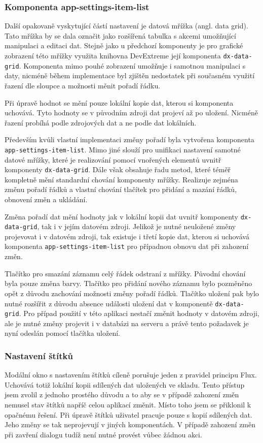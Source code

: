 \subsubsection*{Komponenta app-settings-item-list}
Další opakovaně vyskytující částí nastavení je datová mřížka (angl. data grid). Tato mřížka by se dala označit jako rozšířená tabulka s akcemi umožňující manipulaci a editaci dat. Stejně jako u předchozí komponenty je pro grafické zobrazení této mřížky využita knihovna DevExtreme její komponenta \texttt{dx-data-grid}. Komponenta mimo pouhé zobrazení umožňuje i samotnou manipulaci s daty, nicméně během implementace byl zjištěn nedostatek při současném využití řazení dle sloupce a možnosti měnit pořadí řádku.

Při úpravě hodnot se mění pouze lokální kopie dat, kterou si komponenta uchovává. Tyto hodnoty se v původním zdroji dat projeví až po uložení. Nicméně řazení probíhá podle zdrojových dat a ne podle dat lokálních.

Především kvůli vlastní implementaci změny pořadí byla vytvořena komponenta \texttt{app-settings-item-list}. Mimo jiné slouží pro unifikaci nastavení samotné datové mřížky, které je realizování pomocí vnořených elementů uvnitř komponenty \texttt{dx-data-grid}. Dále však obsahuje řadu metod, které téměř kompletně mění standardní chování komponenty mřížky. Realizuje zejména změnu pořadí řádků a vlastní chování tlačítek pro přidání a mazání řádků, obnovení změn a ukládání.

Změna pořadí dat mění hodnoty jak v lokální kopii dat uvnitř komponenty \texttt{dx-data-grid}, tak i v jejím datovém zdroji. Jelikož je nutné neuložené změny projevovat i v datovém zdroji, tak existuje i třetí kopie dat, kterou si uchovává komponenta \texttt{app-settings-item-list} pro případnou obnovu dat při zahození změn.

Tlačítko pro smazání záznamu celý řádek odstraní z mřížky. Původní chování byla pouze změna barvy. Tlačítko pro přidání nového záznamu bylo pozměněno opět z důvodu zachování možnosti změny pořadí řádků. Tlačítko uložení pak bylo nutné rozšířit z důvodu absence události uložení dat v komponentě \texttt{dx-data-grid}. Pro případ použití v této aplikaci nestačí změnit hodnoty v datovém zdroji, ale je nutné změny projevit i v databázi na serveru a právě tento požadavek je nyní odeslán pomocí tlačítka uložení. 








\subsubsection{Nastavení štítků}
Modální okno s nastavením štítků cíleně porušuje jeden z pravidel principu Flux. Uchovává totiž lokální kopii sdílených dat uložených ve skladu. Tento přístup jsem zvolil z jednoho prostého důvodu a to aby se v případě zahození změn nemusel stav štítků napříč celou aplikací změnit. Místo toho jsem se přiklonil k opačnému řešení. Při úpravě štítků uživatel pracuje pouze s kopií sdílených dat. Jeho změny se tak neprojevují v jiných komponentách. V případě zahození změn při zavření dialogu tudíž není nutné provést vůbec žádnou akci. 


